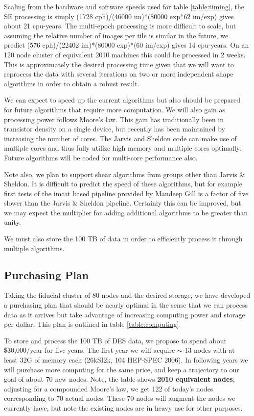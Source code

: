 \documentclass[12pt]{article}
\begin{document}
Scaling from the hardware and software speeds used for table
\ref{table:timing}, the SE processing is simply (1728 cph)/(46000 im)*(80000
exp*62 im/exp) gives about 21 cpu-years.  The multi-epoch processing is more
difficult to scale, but assuming the relative number of images per tile is
similar in the future, we predict (576 cph)/(22402 im)*(80000 exp)*(60 im/exp)
gives 14 cpu-years.  On an 120 node cluster of equivalent 2010 machines this
could be processed in 2 weeks.  This is approximately the desired processing
time given that we will want to reprocess the data with several iterations on
two or more independent shape algorithms in order to obtain a robust result.

We can expect to speed up the current algorithms but also should be prepared
for future algorithms that require more computation.  We will also gain as
processing power follows Moore's law. This gain has traditionally been in
transistor density on a single device, but recently has been maintained by
increasing the number of cores.  The Jarvis and Sheldon code can make use of
multiple cores and thus fully utilize high memory and multiple cores optimally.
Future algorithms will be coded for multi-core performance also.

Note also, we plan to support shear algorithms from groups other than Jarvis \&
Sheldon.  It is difficult to predict the speed of these algorithms, but for
example first tests of the imcat based pipeline provided by Mandeep Gill is a
factor of five slower than the Jarvis \& Sheldon pipeline.  Certainly this can
be improved, but we may expect the multiplier for adding additional algorithms
to be greater than unity.

We must also store the 100 TB of data in order to efficiently process it
through multiple algorithms.  


\subsection{Purchasing Plan}

Taking the fiducial cluster of 80 nodes and the desired storage, we have
developed a purchasing plan that should be nearly optimal in the sense that
we can process data as it arrives but take advantage of increasing computing
power and storage per dollar.  This plan is outlined in table \ref{table:computing}.

To store and process the 100 TB of DES data, we propose to spend about
\$30,000/year for five years. The first year we will acquire $\sim$ 13 nodes
with at least 32G of memory each (26kSI2k, 104 HEP-SPEC 2006).  In following
years we will purchase more computing for the same price, and keep a trajectory
to our goal of about 70 new nodes.  Note, the table shows {\bf 2010 equivalent
nodes}; adjusting for a compounded Moore's law, we get 122 of today's nodes
corresponding to 70 actual nodes.  These 70 nodes will augment the  nodes we
currently have, but note the existing nodes are in heavy use for other
purposes.
\end{document}

